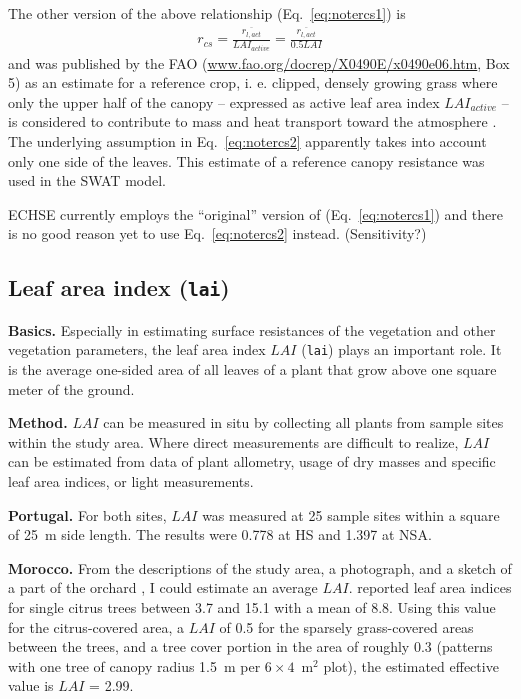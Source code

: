 \documentclass{scrreprt}
\begin{document}
The other version of the above relationship (Eq.~\ref{eq:notercs1}) is
\begin{align} \label{eq:notercs2}
  r_{cs} = \frac{\overline{r_{l,act}}}{LAI_{active}} = \frac{\overline{r_{l,act}}}{0.5 LAI}
\end{align}
%
and was published by the FAO (\url{www.fao.org/docrep/X0490E/x0490e06.htm}, Box 5) as an estimate for a reference crop, i. e. clipped, densely growing grass where only the upper half of the canopy -- expressed as active leaf area index $LAI_{active}$ -- is considered to contribute to mass and heat transport toward the atmosphere \citep{fao98}.
The underlying assumption in Eq.~\eqref{eq:notercs2} apparently takes into account only one side of the leaves.
This estimate of a reference canopy resistance was used in the SWAT model.

ECHSE currently employs the ``original'' version of \citet{shuttleworth85} (Eq.~\ref{eq:notercs1}) and there is no good reason yet to use Eq.~\eqref{eq:notercs2} instead.
(Sensitivity?)

\subsection{Leaf area index (\texttt{lai})} \label{ssec:parest_veg_lai}

\textbf{Basics.}
Especially in estimating surface resistances of the vegetation and other vegetation parameters, the leaf area index $LAI$ (\verb!lai!) plays an important role.
It is the average one-sided area of all leaves of a plant that grow above one square meter of the ground.

\textbf{Method.}
$LAI$ can be measured in situ by collecting all plants from sample sites within the study area.
Where direct measurements are difficult to realize, $LAI$ can be estimated from data of plant allometry, usage of dry masses and specific leaf area indices, or light measurements.

\textbf{Portugal.}
For both sites, $LAI$ was measured at 25 sample sites within a square of 25~m side length.
The results were 0.778 at HS and 1.397 at NSA.

\textbf{Morocco.}
From the descriptions of the study area, a photograph, and a sketch of a part of the orchard \citep{mroos14}, I could estimate an average $LAI$.
\citet{jahn79} reported leaf area indices for single citrus trees between 3.7 and 15.1 with a mean of 8.8.
Using this value for the citrus-covered area, a $LAI$ of 0.5 for the sparsely grass-covered areas between the trees, and a tree cover portion in the area of roughly 0.3 (patterns with one tree of canopy radius 1.5~m per $6 \times 4$~m$^2$ plot), the estimated effective value is $LAI$ = 2.99.
\end{document}
